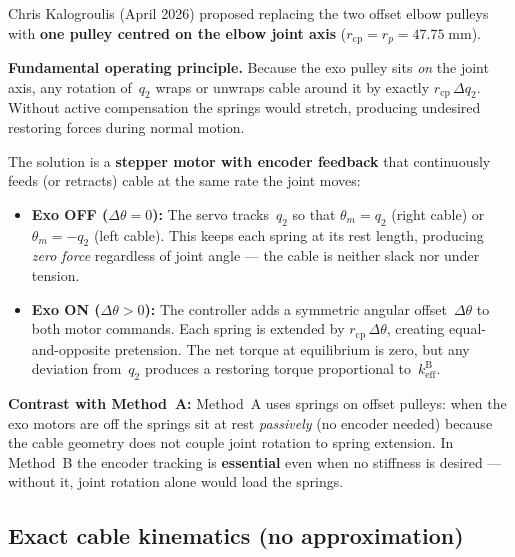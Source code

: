 \documentclass[11pt, a4paper]{article}
\begin{document}
Chris Kalogroulis (April 2026) proposed replacing the two offset elbow
pulleys with \textbf{one pulley centred on the elbow joint axis}
($r_{\text{cp}} = r_p = 47.75\;\text{mm}$).

\begin{mdframed}
\textbf{Fundamental operating principle.}\;
Because the exo pulley sits \emph{on} the joint axis, any rotation of~$q_2$
wraps or unwraps cable around it by exactly $r_{\text{cp}}\,\Delta q_2$.
Without active compensation the springs would stretch, producing undesired
restoring forces during normal motion.

\medskip\noindent
The solution is a \textbf{stepper motor with encoder feedback} that
continuously feeds (or retracts) cable at the same rate the joint moves:
%
\begin{itemize}
    \item \textbf{Exo OFF ($\Delta\theta = 0$):}\;
          The servo tracks~$q_2$ so that $\theta_m = q_2$ (right cable) or
          $\theta_m = -q_2$ (left cable).  This keeps each spring at its
          rest length, producing \emph{zero force} regardless of joint
          angle --- the cable is neither slack nor under tension.
    \item \textbf{Exo ON ($\Delta\theta > 0$):}\;
          The controller adds a symmetric angular offset~$\Delta\theta$
          to both motor commands.  Each spring is extended by
          $r_{\text{cp}}\,\Delta\theta$, creating equal-and-opposite
          pretension.  The net torque at equilibrium is zero, but any
          deviation from~$q_2$ produces a restoring torque proportional
          to~$k_{\text{eff}}^{\text{B}}$.
\end{itemize}

\noindent
\textbf{Contrast with Method~A:}\;
Method~A uses springs on offset pulleys: when the exo motors are off the
springs sit at rest \emph{passively} (no encoder needed) because the cable
geometry does not couple joint rotation to spring extension.  In Method~B
the encoder tracking is \textbf{essential} even when no stiffness is
desired --- without it, joint rotation alone would load the springs.
\end{mdframed}

\subsection{Exact cable kinematics (no approximation)}
\end{document}
